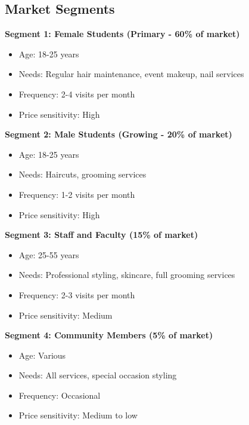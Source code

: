 \documentclass[a4paper,12pt]{article}
\begin{document}
\subsection{Market Segments}

\textbf{Segment 1: Female Students (Primary - 60\% of market)}
\begin{itemize}[leftmargin=2em]
    \item Age: 18-25 years
    \item Needs: Regular hair maintenance, event makeup, nail services
    \item Frequency: 2-4 visits per month
    \item Price sensitivity: High
\end{itemize}

\textbf{Segment 2: Male Students (Growing - 20\% of market)}
\begin{itemize}[leftmargin=2em]
    \item Age: 18-25 years
    \item Needs: Haircuts, grooming services
    \item Frequency: 1-2 visits per month
    \item Price sensitivity: High
\end{itemize}

\textbf{Segment 3: Staff and Faculty (15\% of market)}
\begin{itemize}[leftmargin=2em]
    \item Age: 25-55 years
    \item Needs: Professional styling, skincare, full grooming services
    \item Frequency: 2-3 visits per month
    \item Price sensitivity: Medium
\end{itemize}

\textbf{Segment 4: Community Members (5\% of market)}
\begin{itemize}[leftmargin=2em]
    \item Age: Various
    \item Needs: All services, special occasion styling
    \item Frequency: Occasional
    \item Price sensitivity: Medium to low
\end{itemize}

\vspace{1em}
\end{document}
